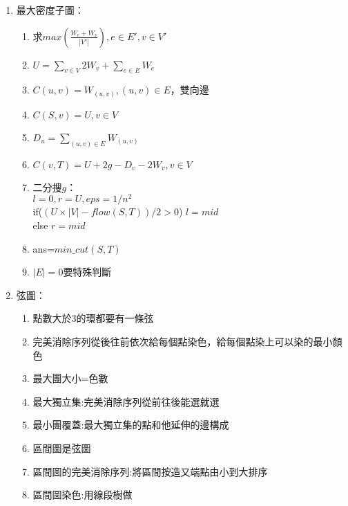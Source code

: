 \begin{enumerate}
\begin{enumerate}
	\end{enumerate}
\item 最大密度子圖：
	\begin{enumerate}\itemsep = -1pt
	\item 求$max\left(\frac{W_e+W_v}{|V'|}\right),e \in E',v \in V'$
	\item $U=\sum_{v \in V}2W_v+\sum_{e \in E} W_e$
	\item $C(u,v)=W_{(u,v)} ,(u,v)\in E$，雙向邊
	\item $C(S,v)=U ,v \in V$
	\item $D_u=\sum_{(u,v) \in E} W_{(u,v)}$
	\item $C(v,T)=U+2g-D_v-2W_v ,v \in V$
	\item 二分搜$g$：\\$l=0,r=U,eps=1/n^2$\\if($(U\times|V|-flow(S,T))/2>0$) $l=mid$\\else $r=mid$
	\item ans=$min\_cut(S,T)$
	\item $|E|=0$要特殊判斷
	\end{enumerate}
\item 弦圖：
	\begin{enumerate}\itemsep = -3pt
	\item 點數大於3的環都要有一條弦
	\item 完美消除序列從後往前依次給每個點染色，給每個點染上可以染的最小顏色
	\item 最大團大小=色數
	\item 最大獨立集:完美消除序列從前往後能選就選
	\item 最小團覆蓋:最大獨立集的點和他延伸的邊構成
	\item 區間圖是弦圖
	\item 區間圖的完美消除序列:將區間按造又端點由小到大排序
	\item 區間圖染色:用線段樹做
	\end{enumerate}
\end{enumerate}

